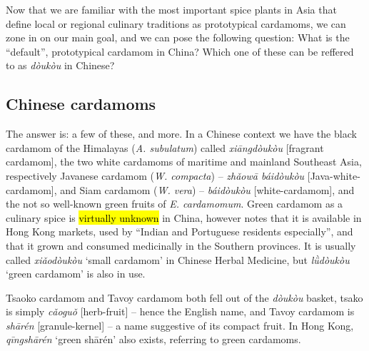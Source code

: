\documentclass[12pt]{article}
\newcommand{\tc}[1]{\traditionalchinesefont{#1}\rmfamily}
\begin{document}

Now that we are familiar with the most important spice plants in Asia that define local or regional culinary traditions as prototypical cardamoms, we can zone in on our main goal, and we can pose the following question: What is the ``default'', prototypical cardamom in China? Which one of these can be reffered to as \textit{dòukòu} in Chinese?

\subsection{Chinese cardamoms}

The answer is: a few of these, and more. In a Chinese context we have the black cardamom of the Himalayas (\textit{A. subulatum}) called \textit{xiāngdòukòu} [fragrant cardamom], the two white cardamoms of maritime and mainland Southeast Asia, respectively Javanese cardamom (\textit{W. compacta}) -- \textit{zhǎowā
báidòukòu} [Java-white-cardamom], and Siam cardamom (\textit{W. vera}) -- \textit{báidòukòu} [white-cardamom], and the not so well-known green fruits of \textit{E. cardamomum}. Green cardamom as a culinary spice is \hl{virtually unknown} in China, however \textcite{hu_2005_food} notes that it is available in Hong Kong markets, used by ``Indian and Portuguese residents especially'', and that it grown and consumed medicinally in the Southern provinces. It is usually called \textit{xiǎodòukòu} `small cardamom' in Chinese Herbal Medicine, but \textit{lǜdòukòu} `green cardamom' is also in use.

Tsaoko cardamom and Tavoy cardamom both fell out of the \textit{dòukòu} basket, tsako is simply \textit{cǎoguǒ} [herb-fruit] -- hence the English name, and Tavoy cardamom is \textit{shārén} [granule-kernel] -- a name suggestive of its compact fruit. In Hong Kong, \tc{青砂仁} \textit{qīngshā​rén} `green shārén' also exists, referring to green cardamoms.
\end{document}

